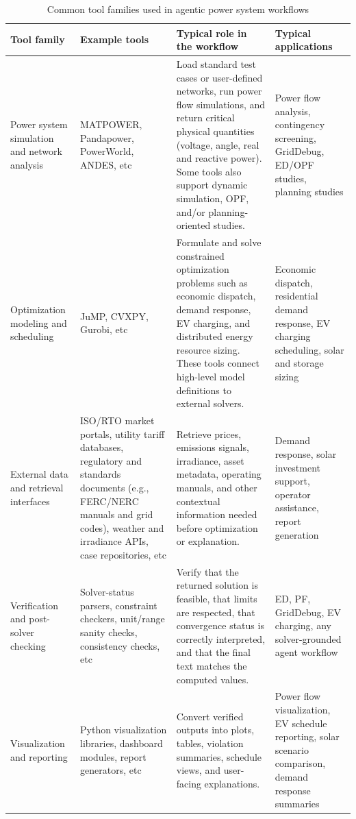 \documentclass[journal,onecolumn]{IEEEtran} %
\begin{document}
\begin{table}[!htbp]
\centering
\footnotesize
\caption{Common tool families used in agentic power system workflows}
\label{tab:common_ps_tools}
\renewcommand{\arraystretch}{1.15}
\setlength{\tabcolsep}{4pt}
\begin{tabularx}{\textwidth}{P{2.8cm} Y Y Y}
\toprule
\textbf{Tool family} & \textbf{Example tools} & \textbf{Typical role in the workflow} & \textbf{Typical applications} \\
\midrule

Power system simulation and network analysis
& MATPOWER, Pandapower, PowerWorld, ANDES, etc
& Load standard test cases or user-defined networks, run power flow simulations, and return critical physical quantities (voltage, angle, real and reactive power). Some tools also support dynamic simulation, OPF, and/or planning-oriented studies.
& Power flow analysis, contingency screening, GridDebug, ED/OPF studies, planning studies \\
\midrule

Optimization modeling and scheduling
& JuMP, CVXPY, Gurobi, etc
& Formulate and solve constrained optimization problems such as economic dispatch, demand response, EV charging, and distributed energy resource sizing. These tools connect high-level model definitions to external solvers.
& Economic dispatch, residential demand response, EV charging scheduling, solar and storage sizing \\
\midrule

External data and retrieval interfaces
& {ISO/RTO market portals, utility tariff databases, regulatory and standards documents (e.g., FERC/NERC manuals and grid codes), weather and irradiance APIs, case repositories, etc}%
& Retrieve prices, emissions signals, irradiance, asset metadata, operating manuals, and other contextual information needed before optimization or explanation.
& Demand response, solar investment support, operator assistance, report generation \\
\midrule

Verification and post-solver checking
& Solver-status parsers, constraint checkers, unit/range sanity checks, consistency checks, etc
& Verify that the returned solution is feasible, that limits are respected, that convergence status is correctly interpreted, and that the final text matches the computed values.
& ED, PF, GridDebug, EV charging, any solver-grounded agent workflow \\
\midrule
Visualization and reporting
& Python visualization libraries, dashboard modules, report generators, etc
& Convert verified outputs into plots, tables, violation summaries, schedule views, and user-facing explanations.
& Power flow visualization, EV schedule reporting, solar scenario comparison, demand response summaries \\
\bottomrule
\end{tabularx}
\end{table}
\end{document}
